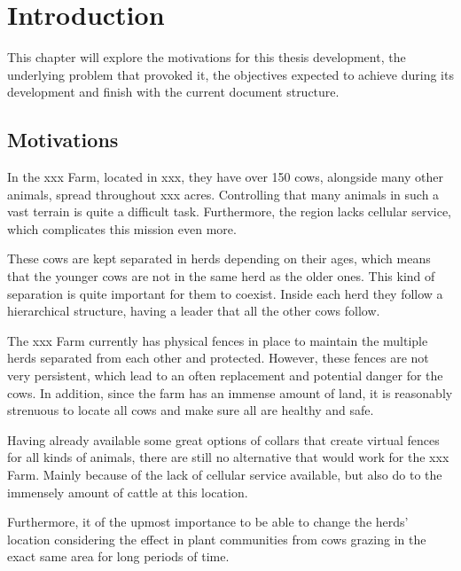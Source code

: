 
%

\chapter{Introduction}
\label{cha:introduction}
This chapter will explore the motivations for this thesis development, the
underlying problem that provoked it, the objectives expected to achieve during its
development and finish with the current document structure.

\section{Motivations}
\label{sec:motivations}
In the xxx Farm, located in xxx, they have over 150 cows, alongside many other animals, spread
throughout xxx acres. Controlling that many animals in such a vast terrain is quite a difficult
task. Furthermore, the region lacks cellular service, which complicates this mission even more.

These cows are kept separated in herds depending on their ages, which means that the younger
cows are not in the same herd as the older ones. This kind of separation is quite important
for them to coexist. Inside each herd they follow a hierarchical structure, having a leader
that all the other cows follow.

The xxx Farm currently has physical fences in place to maintain the multiple herds separated
from each other and protected. However, these fences are not very persistent, which lead to an
often replacement and potential danger for the cows. In addition, since the farm has an
immense amount of land, it is reasonably strenuous to locate all cows and make sure all
are healthy and safe.

Having already available some great options of collars that create virtual fences for all
kinds of animals, there are still no alternative that would work for the xxx Farm. Mainly
because of the lack of cellular service available, but also do to the immensely amount of
cattle at this location.

Furthermore, it of the upmost importance to be able to change the herds' location considering
the effect in plant communities from cows grazing in the exact same area for long periods
of time.

